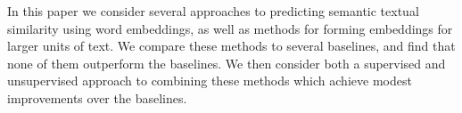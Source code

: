 In this paper we consider several approaches to predicting semantic textual similarity using word embeddings, as well as methods for forming embeddings for larger units of text. We compare these methods to several baselines, and find that none of them outperform the baselines. We then consider both a supervised and unsupervised approach to combining these methods which achieve modest improvements over the baselines.
